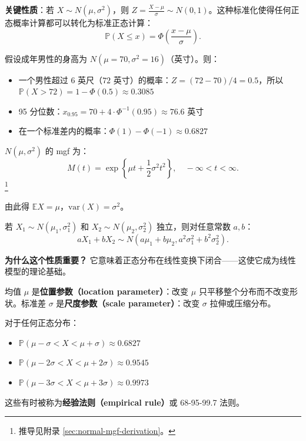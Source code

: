 \textbf{关键性质}：若 $X \sim N(\mu, \sigma^{2})$，则 $Z = \frac{X-\mu}{\sigma} \sim N(0,1)$。这种标准化使得任何正态概率计算都可以转化为标准正态计算：
\[
\mathbb{P}(X \leq x) = \Phi\!\left(\frac{x-\mu}{\sigma}\right).
\label{eq:normal-cdf-standardization-ch3}
\]

\begin{example}[身高分布]\label{ex:height-normal-ch3}
假设成年男性的身高为 $N(\mu=70, \sigma^{2}=16)$（英寸）。则：
\begin{itemize}
\item 一个男性超过 6 英尺（$72$ 英寸）的概率：$Z = (72-70)/4 = 0.5$，所以 $\mathbb{P}(X > 72) = 1 - \Phi(0.5) \approx 0.3085$
\item 95 分位数：$x_{0.95} = 70 + 4 \cdot \Phi^{-1}(0.95) \approx 76.6$ 英寸
\item 在一个标准差内的概率：$\Phi(1) - \Phi(-1) \approx 0.6827$
\end{itemize}
\end{example}

$N(\mu, \sigma^{2})$ 的 mgf 为：
\[
M(t) = \exp\left\{\mu t + \frac{1}{2}\sigma^{2}t^{2}\right\}, \quad -\infty < t < \infty.
\label{eq:normal-mgf-ch3}
\]\footnote{推导见附录 \cref{sec:normal-mgf-derivation}。}

由此得 $\mathbb{E}X = \mu$，$\text{var}(X) = \sigma^{2}$。

\begin{theorem}[正态变量的线性组合]\label{th:normal-linear-combination-ch3}
若 $X_1 \sim N(\mu_1, \sigma_1^{2})$ 和 $X_2 \sim N(\mu_2, \sigma_2^{2})$ 独立，则对任意常数 $a, b$：
\[
aX_1 + bX_2 \sim N(a\mu_1 + b\mu_2, a^{2}\sigma_1^{2} + b^{2}\sigma_2^{2}).
\label{eq:normal-linear-combination-ch3}
\]
\end{theorem}

\textbf{为什么这个性质重要？} 它意味着正态分布在线性变换下闭合——这使它成为线性模型的理论基础。

\begin{example}\label{rmk:normal-location-scale-ch3}
均值 $\mu$ 是\textbf{位置参数（location parameter）}：改变 $\mu$ 只平移整个分布而不改变形状。标准差 $\sigma$ 是\textbf{尺度参数（scale parameter）}：改变 $\sigma$ 拉伸或压缩分布。
\end{example}

\begin{example}\label{rmk:empirical-rule-ch3}
对于任何正态分布：
\begin{itemize}
\item $\mathbb{P}(\mu - \sigma < X < \mu + \sigma) \approx 0.6827$
\item $\mathbb{P}(\mu - 2\sigma < X < \mu + 2\sigma) \approx 0.9545$
\item $\mathbb{P}(\mu - 3\sigma < X < \mu + 3\sigma) \approx 0.9973$
\end{itemize}
这些有时被称为\textbf{经验法则（empirical rule）}或 68-95-99.7 法则。
\end{example}

